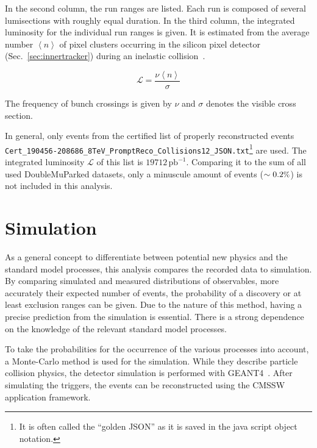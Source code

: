 
In the second column, the run ranges are listed. Each run is composed of several lumisections with roughly equal duration. In the third column, the integrated luminosity for the individual run ranges is given. It is estimated from the average number $\left< n \right>$ of pixel clusters occurring in the silicon pixel detector (Sec.~\ref{sec:innertracker}) during an inelastic collision~\cite{cms-pixel-lumi-13}.

\begin{equation}
  \label{eq:lumi}
  \mathcal{L} = \frac{\nu \left< n \right>}{\sigma}
\end{equation}

\noindent The frequency of bunch crossings is given by $\nu$ and $\sigma$ denotes the visible cross section. 

In general, only events from the certified list of properly reconstructed events \\ \verb+Cert_190456-208686_8TeV_PromptReco_Collisions12_JSON.txt+\footnote{It is often called the ``golden JSON'' as it is saved in the java script object notation.} are used. The integrated luminosity $\mathcal{L}$ of this list is $19712\,\text{pb}^{-1}$. Comparing it to the sum of all used DoubleMuParked datasets, only a minuscule amount of events ($\sim 0.2\pct$) is not included in this analysis.

\section{Simulation}

As a general concept to differentiate between potential new physics and the standard model processes, this analysis compares the recorded data to simulation. By comparing simulated and measured distributions of observables, more accurately their expected number of events, the probability of a discovery or at least exclusion ranges can be given. Due to the nature of this method, having a precise prediction from the simulation is essential. There is a strong dependence on the knowledge of the relevant standard model processes.

To take the probabilities for the occurrence of the various processes into account, a Monte-Carlo method is used for the simulation. While they describe particle collision physics, the detector simulation is performed with \textsc{GEANT4}~\cite{geant41,geant42}. After simulating the triggers, the events can be reconstructed using the \textsc{CMSSW} application framework.

